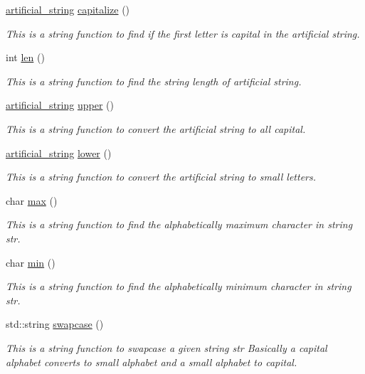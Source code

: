 \begin{DoxyCompactItemize}
\item 
\hyperlink{classartificial__string}{artificial\+\_\+string} \hyperlink{classartificial__string_a36c68ec5c9a81edd512bc9e6efe9c80f}{capitalize} ()
\begin{DoxyCompactList}\small\item\em This is a string function to find if the first letter is capital in the artificial string. \end{DoxyCompactList}\item 
int \hyperlink{classartificial__string_a63b0290f444616cb06eb1776af0d80f2}{len} ()
\begin{DoxyCompactList}\small\item\em This is a string function to find the string length of artificial string. \end{DoxyCompactList}\item 
\hyperlink{classartificial__string}{artificial\+\_\+string} \hyperlink{classartificial__string_af6e84a28ddeb314ba6bf36cee3f9f69a}{upper} ()
\begin{DoxyCompactList}\small\item\em This is a string function to convert the artificial string to all capital. \end{DoxyCompactList}\item 
\hyperlink{classartificial__string}{artificial\+\_\+string} \hyperlink{classartificial__string_a62c0582989da7db85168759750892e58}{lower} ()
\begin{DoxyCompactList}\small\item\em This is a string function to convert the artificial string to small letters. \end{DoxyCompactList}\item 
char \hyperlink{classartificial__string_a4cf090a85d3cdcbf8da89720cf0db4e1}{max} ()
\begin{DoxyCompactList}\small\item\em This is a string function to find the alphabetically maximum character in string str. \end{DoxyCompactList}\item 
char \hyperlink{classartificial__string_ab4443974192f4048eb55f3bd2e435885}{min} ()
\begin{DoxyCompactList}\small\item\em This is a string function to find the alphabetically minimum character in string str. \end{DoxyCompactList}\item 
std\+::string \hyperlink{classartificial__string_a4e218591cde8a4ac23dd63c48ca895e3}{swapcase} ()
\begin{DoxyCompactList}\small\item\em This is a string function to swapcase a given string str Basically a capital alphabet converts to small alphabet and a small alphabet to capital. \end{DoxyCompactList}\end{DoxyCompactItemize}
